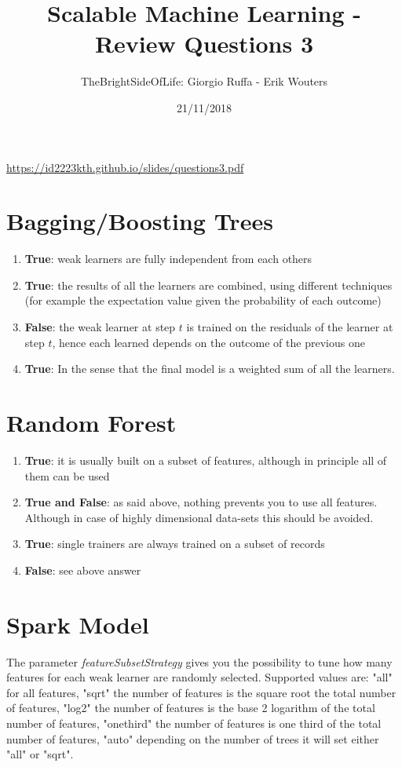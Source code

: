 \documentclass[a4paper]{article}
\title{Scalable Machine Learning - Review Questions 3}
\author{TheBrightSideOfLife: Giorgio Ruffa - Erik Wouters}
\date{21/11/2018}
\begin{document}
\maketitle

\url{https://id2223kth.github.io/slides/questions3.pdf}

\section{Bagging/Boosting Trees}
\begin{enumerate}[label=(\alph*)]
    \item \textbf{True}: weak learners are fully independent from each others
    \item \textbf{True}: the results of all the learners are combined, using different techniques (for example the expectation value given the probability of each outcome)
    \item \textbf{False}: the weak learner at step $t$ is trained on the residuals of the learner at step $t$, hence each learned depends on the outcome of the previous one
    \item \textbf{True}: In the sense that the final model is a weighted sum of all the learners.
\end{enumerate}
\section{Random Forest}
\begin{enumerate}[label=(\alph*)]
    \item \textbf{True}: it is usually built on a subset of features, although in principle all of them can be used
    \item \textbf{True and False}: as said above, nothing prevents you to use all features. Although in case of highly dimensional data-sets this should be avoided.
    \item \textbf{True}: single trainers are always trained on a subset of records
    \item \textbf{False}: see above answer
\end{enumerate}

\section{Spark Model}
The parameter \textit{featureSubsetStrategy} gives you the possibility to tune how many features for each weak learner are randomly selected.
Supported values are:  "all" for all features, "sqrt" the number of features is the square root the total number of features, "log2" the number of features is the base 2 logarithm of the total number of features, "onethird" the number of features is one third of the total number of features, "auto" depending on the number of trees it will set either "all" or "sqrt".
\end{document}

